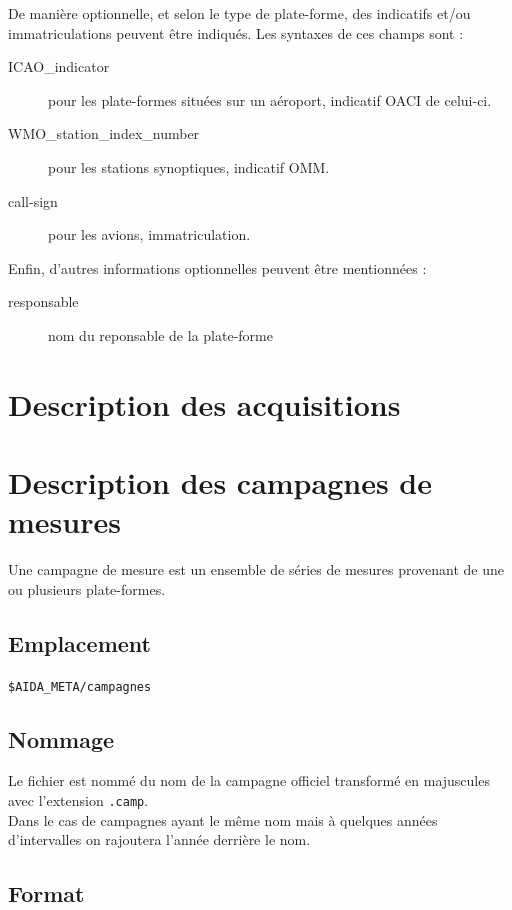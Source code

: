   De manière optionnelle, et selon le type de plate-forme, des indicatifs
et/ou immatriculations peuvent être indiqués. Les syntaxes de ces champs sont :
\begin{description}
  \item[ICAO\_indicator] pour les plate-formes situées sur un aéroport,
    indicatif OACI de celui-ci.
  \item[WMO\_station\_index\_number] pour les stations synoptiques,
    indicatif OMM.
  \item[call-sign] pour les avions, immatriculation.
\end{description}

  Enfin, d'autres informations optionnelles peuvent être mentionnées :
\begin{description}
  \item[responsable] nom du reponsable de la plate-forme
\end{description}

\section{Description des acquisitions}



\section{Description des campagnes de mesures}
\label{sec:campagnes}
Une campagne de mesure est un ensemble de séries de mesures provenant de une ou plusieurs
plate-formes.

\subsection{Emplacement}
\texttt{\$AIDA\_META\//campagnes}
 
\subsection{Nommage}

Le fichier est nommé du nom de la campagne officiel transformé 
en majuscules avec l'extension \texttt{.camp}.\\
Dans le cas de campagnes ayant le même nom mais à quelques années d'intervalles on rajoutera 
l'année derrière le nom.

\subsection{Format}


